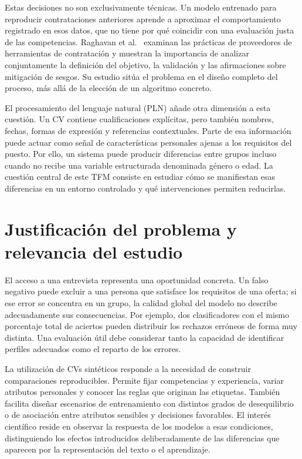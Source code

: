 \documentclass[11pt,a4paper,oneside]{report}
\begin{document}
Estas decisiones no son exclusivamente técnicas. Un modelo entrenado para reproducir contrataciones anteriores aprende a aproximar el comportamiento registrado en esos datos, que no tiene por qué coincidir con una evaluación justa de las competencias. Raghavan et al.\ \cite{raghavan2020} examinan las prácticas de proveedores de herramientas de contratación y muestran la importancia de analizar conjuntamente la definición del objetivo, la validación y las afirmaciones sobre mitigación de sesgos. Su estudio sitúa el problema en el diseño completo del proceso, más allá de la elección de un algoritmo concreto.

El procesamiento del lenguaje natural (PLN) añade otra dimensión a esta cuestión. Un CV contiene cualificaciones explícitas, pero también nombres, fechas, formas de expresión y referencias contextuales. Parte de esa información puede actuar como señal de características personales ajenas a los requisitos del puesto. Por ello, un sistema puede producir diferencias entre grupos incluso cuando no recibe una variable estructurada denominada género o edad. La cuestión central de este TFM consiste en estudiar cómo se manifiestan esas diferencias en un entorno controlado y qué intervenciones permiten reducirlas.

\section{Justificación del problema y relevancia del estudio}

El acceso a una entrevista representa una oportunidad concreta. Un falso negativo puede excluir a una persona que satisface los requisitos de una oferta; si ese error se concentra en un grupo, la calidad global del modelo no describe adecuadamente sus consecuencias. Por ejemplo, dos clasificadores con el mismo porcentaje total de aciertos pueden distribuir los rechazos erróneos de forma muy distinta. Una evaluación útil debe considerar tanto la capacidad de identificar perfiles adecuados como el reparto de los errores.

La utilización de CVs sintéticos responde a la necesidad de construir comparaciones reproducibles. Permite fijar competencias y experiencia, variar atributos personales y conocer las reglas que originan las etiquetas. También facilita diseñar escenarios de entrenamiento con distintos grados de desequilibrio o de asociación entre atributos sensibles y decisiones favorables. El interés científico reside en observar la respuesta de los modelos a esas condiciones, distinguiendo los efectos introducidos deliberadamente de las diferencias que aparecen por la representación del texto o el aprendizaje.
\end{document}

